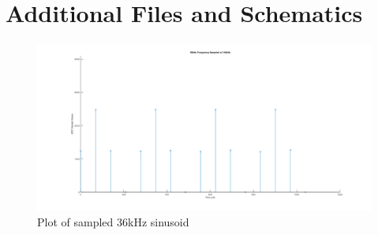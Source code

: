 \chapter{Additional Files and Schematics}
\label{ch_appendixa}






\begin{figure}[H]
	\centering
	\includegraphics[width=\linewidth]{figures/results/36khz_frequency.png}
	\caption{Plot of sampled 36kHz sinusoid}
	\label{fig:sampled_36khz_sinusoid}
\end{figure}